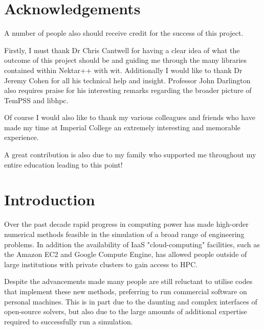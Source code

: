 \documentclass[11pt, a4paper]{report}
\begin{document}
\chapter*{Acknowledgements}
A number of people also should receive credit for the success of this project.

Firstly, I must thank Dr Chris Cantwell for having a clear idea of what the outcome of this project should be and guiding me through the many libraries contained within Nektar++ with wit. Additionally I would like to thank Dr Jeremy Cohen for all his technical help and insight. Professor John Darlington also requires praise for his interesting remarks regarding the broader picture of TemPSS and libhpc.

Of course I would also like to thank my various colleagues and friends who have made my time at Imperial College an extremely interesting and memorable experience.

A great contribution is also due to my family who supported me throughout my entire education leading to this point!
\newpage

\newpage
\tableofcontents
\printnomenclature
\newpage
\listoffigures

\listoftables
\newpage
\chapter{Introduction}
Over the past decade rapid progress in computing power has made high-order numerical methods feasible in the simulation of a broad range of engineering problems. In addition the availability of IaaS "cloud-computing" facilities, such as the Amazon EC2\cite{Amazon_2013} and Google Compute Engine\cite{Google2015}, has allowed people outside of large institutions with private clusters to gain access to HPC.

Despite the advancements made many people are still reluctant to utilise codes that implement these new methods, preferring to run commercial software on personal machines. This is in part due to the daunting and complex interfaces of open-source solvers, but also due to the large amounts of additional expertise required to successfully run a simulation.
\end{document}
